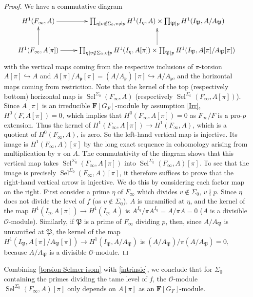\documentclass[12 pt]{amsart}
\theoremstyle{plain}
\theoremstyle{definition}
\numberwithin{equation}{section}
\numberwithin{table}{section}
\begin{document}
\begin{proof}
We have a commutative diagram
\begin{equation*}
\xymatrix{H^1(F_\infty,A) \ar[r] & \prod_{\eta\mid v\notin\Sigma_0,v\neq p}H^1(I_\eta,A)\times
\prod_{\mathfrak{P}\mid p} H^1(I_\mathfrak{P},A/A_\mathfrak{P})\\
H^1(F_\infty,A[\pi]) \ar[u] \ar[r] & \prod_{\eta\mid v\notin\Sigma_0,v\nmid p}H^1(I_\eta,A[\pi])
\times\prod_{\mathfrak{P}\mid p}H^1(I_\mathfrak{P},A[\pi]/A_\mathfrak{P}[\pi]) \ar[u]}
\end{equation*}
with the vertical maps coming from the respective inclusions of $\pi$-torsion $A[\pi]\hookrightarrow A$ and $A[\pi]/A_\mathfrak{p}[\pi]=(A/A_\mathfrak{p})[\pi]\hookrightarrow A/A_\mathfrak{p}$, and the horizontal maps coming from restriction. Note that the kernel of the top (respectively bottom) horizontal map is $\operatorname{Sel}^{\Sigma_0}(F_\infty,A)$ (respectively $\operatorname{Sel}^{\Sigma_0}(F_\infty,A[\pi])$). Since $A[\pi]$ is an irreducible $\mathbf{F}[G_F]$-module by assumption \cref{Irr}, $H^0(F,A[\pi])=0$, which implies that $H^0(F_\infty,A[\pi])=0$ as $F_\infty/F$ is a pro-$p$ extension. Thus the kernel of $H^1(F_\infty,A[\pi])\rightarrow H^1(F_\infty,A)$, which is a quotient of $H^0(F_\infty,A)$, is zero. So the left-hand vertical map is injective. Its image is $H^1(F_\infty,A)[\pi]$ by the long exact sequence in cohomology arising from multiplication by $\pi$ on $A$. The commutativity of the diagram shows that this vertical map takes $\operatorname{Sel}^{\Sigma_0}(F_\infty,A[\pi])$ into $\operatorname{Sel}^{\Sigma_0}(F_\infty,A)[\pi]$. To see that the image is precisely $\operatorname{Sel}^{\Sigma_0}(F_\infty,A)[\pi]$, it therefore suffices to prove that the right-hand vertical arrow is injective. We do this by considering each factor map on the right. First consider a prime $\eta$ of $F_\infty$ which divides $v\notin\Sigma_0$, $v\nmid p$. Since $\eta$ does not divide the level of $f$ (as $v\notin\Sigma_0$), $A$ is unramified at $\eta$, and the kernel of the map $H^1(I_\eta,A[\pi])\rightarrow H^1(I_\eta,A)$ is $A^{I_\eta}/\pi A^{I_\eta}=A/\pi A=0$ ($A$ is a divisible $\mathscr{O}$-module). Similarly, if $\mathfrak{P}$ is a prime of $F_\infty$ dividing $p$, then, since $A/A_\mathfrak{P}$ is unramified at $\mathfrak{P}$, the kernel of the map $H^1(I_\mathfrak{P},A[\pi]/A_\mathfrak{P}[\pi])\rightarrow H^1(I_\mathfrak{P},A/A_\mathfrak{P})$ is $(A/A_\mathfrak{P})/\pi(A/A_\mathfrak{P})=0$, because $A/A_\mathfrak{P}$ is a divisible $\mathscr{O}$-module.
\end{proof}
\indent Combining \cref{torsion-Selmer-isom} with \cref{intrinsic}, we conclude that for $\Sigma_0$ containing the primes dividing the tame level of $f$, the $\mathscr{O}$-module $\operatorname{Sel}^{\Sigma_0}(F_\infty,A)[\pi]$ only depends on $A[\pi]$ as an $\mathbf{F}[G_F]$-module.
\end{document}
